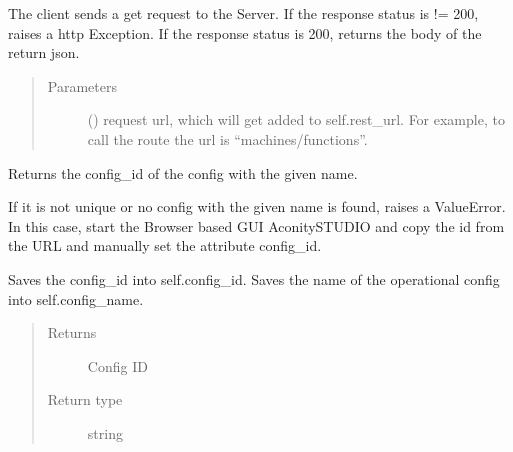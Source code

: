 \documentclass[letterpaper,10pt,english,openany,oneside]{sphinxmanual}
\begin{document}
\begin{fulllineitems}
\begin{fulllineitems}
\label{\detokenize{_modules/AconitySTUDIO_client:AconitySTUDIO_client.AconitySTUDIO_client.get}}
The client sends a get request to the Server.
If the response status is != 200, raises a http Exception.
If the response status is 200, returns the body of the return json.
\begin{quote}\begin{description}
\item[{Parameters}] \leavevmode
{} () \textendash{} request url, which will get added to self.rest\_url.
For example, to call the route 
the url is “machines/functions”.

\end{description}\end{quote}

\end{fulllineitems}


\begin{fulllineitems}
\label{\detokenize{_modules/AconitySTUDIO_client:AconitySTUDIO_client.AconitySTUDIO_client.get_config_id}}
Returns the config\_id of the config with the given name.

If it is not unique or no config with the given name is found, raises a ValueError.
In this case, start the Browser based GUI AconitySTUDIO and copy the id from the URL and manually set the attribute config\_id.

Saves the config\_id into self.config\_id.
Saves the name of the operational config into self.config\_name.
\begin{quote}\begin{description}
\item[{Returns}] \leavevmode
Config ID

\item[{Return type}] \leavevmode
string

\end{description}\end{quote}


\end{fulllineitems}
\end{fulllineitems}
\end{document}
